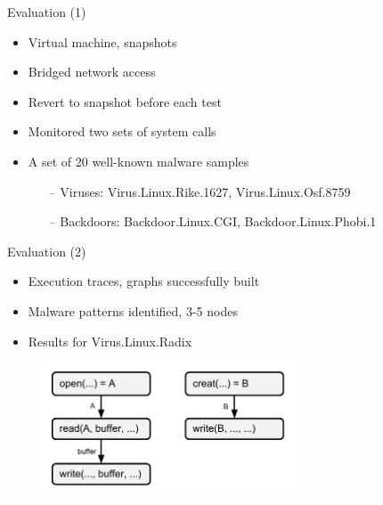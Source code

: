 \documentclass{beamer}
\begin{document}
\begin{frame}{Evaluation (1)}
  \begin{itemize}
    \item<1-> Virtual machine, snapshots
    \item<1-> Bridged network access
    \item<1-> Revert to snapshot before each test
    \vspace{0.3cm}
    \item<2-> Monitored two sets of system calls
    \vspace{0.3cm}
    \item<3-> A set of 20 well-known malware samples
    \begin{itemize}
      \item[--] Viruses: Virus.Linux.Rike.1627, Virus.Linux.Osf.8759
      \item[--] Backdoors: Backdoor.Linux.CGI, Backdoor.Linux.Phobi.1
    \end{itemize}
  \end{itemize}
\end{frame}

\begin{frame}{Evaluation (2)}
  \begin{itemize}
    \item Execution traces, graphs successfully built
    \item Malware patterns identified, 3-5 nodes
    \item Results for Virus.Linux.Radix
  \end{itemize}
  \begin{figure}[p]
    \includegraphics[width=3in]{img/malspec-result.pdf}
  \end{figure}
\end{frame}
\end{document}
